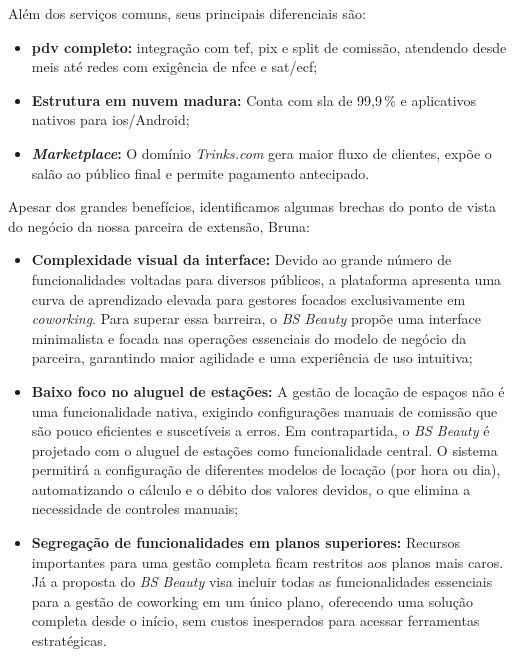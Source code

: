 Além dos serviços comuns, seus principais diferenciais são:

\begin{itemize}
	\item \textbf{\gls{pdv} completo:} integração com \gls{tef}, \gls{pix} e split de comissão, atendendo desde \gls{mei}s até redes com exigência de \gls{nfce} e \gls{sat}/\gls{ecf};
	
	\item \textbf{Estrutura em nuvem madura:} Conta com \gls{sla} de 99,9\,\% e aplicativos nativos para \gls{ios}/Android;
	
	\item \textbf{\emph{Marketplace}:} O domínio \textit{Trinks.com} gera maior fluxo de clientes, expõe o salão ao	público final e permite pagamento antecipado.
\end{itemize}

Apesar dos grandes benefícios, identificamos algumas brechas do ponto de vista do negócio da nossa parceira de extensão, Bruna:

\begin{itemize}
	\item \textbf{Complexidade visual da interface:} Devido ao grande número de funcionalidades voltadas para diversos públicos, a plataforma apresenta uma curva de aprendizado elevada para gestores focados exclusivamente em \emph{coworking}. Para superar essa barreira, o \emph{BS Beauty} propõe uma interface minimalista e focada nas operações essenciais do modelo de negócio da parceira, garantindo maior agilidade e uma experiência de uso intuitiva;
	
	\item \textbf{Baixo foco no aluguel de estações:} A gestão de locação de espaços não é uma funcionalidade nativa, exigindo configurações manuais de comissão que são pouco eficientes e suscetíveis a erros. Em contrapartida, o \emph{BS Beauty} é projetado com o aluguel de estações como funcionalidade central. O sistema permitirá a configuração de diferentes modelos de locação (por hora ou dia), automatizando o cálculo e o débito dos valores devidos, o que elimina a necessidade de controles manuais;
	
	\item \textbf{Segregação de funcionalidades em planos superiores:} Recursos importantes para uma gestão completa ficam restritos aos planos mais caros. Já a proposta do \emph{BS Beauty} visa incluir todas as funcionalidades essenciais para a gestão de coworking em um único plano, oferecendo uma solução completa desde o início, sem custos inesperados para acessar ferramentas estratégicas.
	
\end{itemize}

